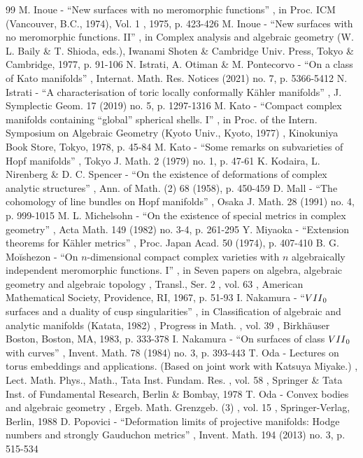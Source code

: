 \documentclass[11pt]{article}
\theoremstyle{definition}
\begin{document}
\begin{thebibliography}{99}
 M. Inoue - “New surfaces with no meromorphic functions” , in Proc. ICM (Vancouver, B.C., 1974), Vol. 1 , 1975, p. 423-426
 M. Inoue - “New surfaces with no meromorphic functions. II” , in Complex analysis and algebraic geometry (W. L. Baily \& T. Shioda, eds.), Iwanami Shoten \& Cambridge Univ. Press, Tokyo \& Cambridge, 1977, p. 91-106
 N. Istrati, A. Otiman \& M. Pontecorvo - “On a class of Kato manifolds” , Internat. Math. Res. Notices (2021) no. 7, p. 5366-5412
 N. Istrati - “A characterisation of toric locally conformally Kähler manifolds” , J. Symplectic Geom. 17 (2019) no. 5, p. 1297-1316
 M. Kato - “Compact complex manifolds containing “global” spherical shells. I” , in Proc. of the Intern. Symposium on Algebraic Geometry (Kyoto Univ., Kyoto, 1977) , Kinokuniya Book Store, Tokyo, 1978, p. 45-84
 M. Kato - “Some remarks on subvarieties of Hopf manifolds” , Tokyo J. Math. 2 (1979) no. 1, p. 47-61
 K. Kodaira, L. Nirenberg \& D. C. Spencer - “On the existence of deformations of complex analytic structures” , Ann. of Math. (2) 68 (1958), p. 450-459
 D. Mall - “The cohomology of line bundles on Hopf manifolds” , Osaka J. Math. 28 (1991) no. 4, p. 999-1015
 M. L. Michelsohn - “On the existence of special metrics in complex geometry” , Acta Math. 149 (1982) no. 3-4, p. 261-295
 Y. Miyaoka - “Extension theorems for Kähler metrics” , Proc. Japan Acad. 50 (1974), p. 407-410
 B. G. Moĭshezon - “On $n$-dimensional compact complex varieties with $n$ algebraically independent meromorphic functions. I” , in Seven papers on algebra, algebraic geometry and algebraic topology , Transl., Ser. 2 , vol. 63 , American Mathematical Society, Providence, RI, 1967, p. 51-93
 I. Nakamura - “${\rm VII}_{0}$ surfaces and a duality of cusp singularities” , in Classification of algebraic and analytic manifolds (Katata, 1982) , Progress in Math. , vol. 39 , Birkhäuser Boston, Boston, MA, 1983, p. 333-378
 I. Nakamura - “On surfaces of class ${\rm VII}_0$ with curves” , Invent. Math. 78 (1984) no. 3, p. 393-443
 T. Oda - Lectures on torus embeddings and applications. (Based on joint work with Katsuya Miyake.) , Lect. Math. Phys., Math., Tata Inst. Fundam. Res. , vol. 58 , Springer \& Tata Inst. of Fundamental Research, Berlin \& Bombay, 1978
 T. Oda - Convex bodies and algebraic geometry , Ergeb. Math. Grenzgeb. (3) , vol. 15 , Springer-Verlag, Berlin, 1988
 D. Popovici - “Deformation limits of projective manifolds: Hodge numbers and strongly Gauduchon metrics” , Invent. Math. 194 (2013) no. 3, p. 515-534

\end{thebibliography}
\end{document}
